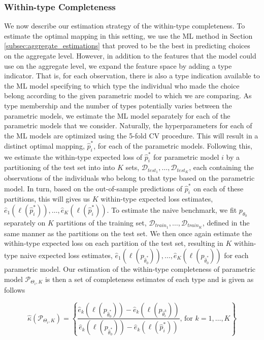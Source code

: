 \documentclass[11pt,a4paper]{article}
\theoremstyle{definition}
\begin{document}
\subsubsection{Within-type Completeness}
\label{subsubsec:within-type_completeness}
We now describe our estimation strategy of the within-type completeness. To estimate the optimal mapping in this setting, we use the ML method in Section \ref{subsec:aggregate_estimations} that proved to be the best in predicting choices on the aggregate level. However, in addition to the features that the model could use on the aggregate level, we expand the feature space by adding a type indicator. That is, for each observation, there is also a type indication available to the ML model specifying to which type the individual who made the choice belong according to the given parametric model to which we are comparing. As type membership and the number of types potentially varies between the parametric models, we estimate the ML model separately for each of the parametric models that we consider. Naturally, the hyperparameters for each of the ML models are optimized using the 5-fold CV procedure. This will result in a distinct optimal mapping, \(\hat{p}^*_{i}\), for each of the parametric models. Following this, we estimate the within-type expected loss of \(\hat{p}^*_{i}\) for parametric model \(i\) by a partitioning of the test set into into \(K\) sets, \(\mathcal{D}_{test_1},\dots,\mathcal{D}_{test_K}\), each containing the observations of the individuals who belong to that type based on the parametric model. In turn, based on the out-of-sample predictions of \(\hat{p}^*_{i}\) on each of these partitions, this will gives us \(K\) within-type expected loss estimates,  \(\hat{e}_1(\ell(\hat{p}^{*}_{i})),\dots,\hat{e}_K(\ell(\hat{p}^{*}_{i}))\). To estimate the naive benchmark, we fit \(p_{\theta_{0}}\) separately on \(K\) partitions of the training set, \(\mathcal{D}_{train_1},\dots,\mathcal{D}_{train_K}\),  defined in the same manner as the partitions on the test set. We then once again estimate the within-type expected loss on each partition of the test set, resulting in \(K\) within-type naive expected loss estimates, \(\hat{e}_1(\ell(p_{\hat{\theta}^{*}_{0}})),\dots,\hat{e}_K(\ell(p_{\hat{\theta}^{*}_{0}}))\) for each parametric model. Our estimation of the within-type completeness of parametric model \(\mathcal{P}_{\Theta_i,K}\) is then a set of completeness estimates of each type and is given as follows

\begin{equation}
\label{eq:type-completeness_estim}
\hat{\kappa}(\mathcal{P}_{\Theta_i,K})=\left\{\frac{\hat{e}_k(\ell(p_{\hat{\theta}^*_{0}}))-\hat{e}_k(\ell(p_{\hat{\theta}^{k}_{i}}))}{\hat{e}_k(\ell(p_{\hat{\theta}^*_{0}}))-\hat{e}_k(\ell(\hat{p}^{*}_{i}))}\text{, for } k=1,\dots, K\right\}
\end{equation}
\end{document}
